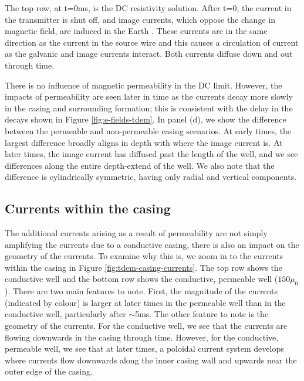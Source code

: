 The top row, at t=0ms, is the DC resistivity solution. After t=0, the current in the transmitter is shut off, and image currents, which oppose the change in magnetic field, are induced in the Earth \citep{nabighian_quasi-static_1979}. These currents are in the same direction as the current in the source wire and this causes a circulation of current as the galvanic and image currents interact. Both currents diffuse down and out through time.




There is no influence of magnetic permeability in the DC limit. However, the impacts of permeability are seen later in time as the currents decay more slowly in the casing and surrounding formation; this is consistent with the delay in the decays shown in Figure \ref{fig:e-fields-tdem}. In panel (d), we show the difference between the permeable and non-permeable casing scenarios. At early times, the largest difference broadly aligns in depth with where the image current is. At later times, the image current has diffused past the length of the well, and we see differences along the entire depth-extend of the well. We also note that the difference is cylindrically symmetric, having only radial and vertical components.


\subsection{Currents within the casing}
The additional currents arising as a result of permeability are not simply amplifying the currents due to a conductive casing, there is also an impact on the geometry of the currents. To examine why this is, we zoom in to the currents within the casing in Figure \ref{fig:tdem-casing-currents}. The top row shows the conductive well and the bottom row shows the conductive, permeable well ($150\mu_0$). There are two main features to note. First, the magnitude of the currents (indicated by colour) is larger at later times in the permeable well than in the conductive well, particularly after $\sim$5ms. The other feature to note is the geometry of the currents. For the conductive well, we see that the currents are flowing downwards in the casing through time. However, for the conductive, permeable well, we see that at later times, a poloidal current system develops where currents flow downwards along the inner casing wall and upwards near the outer edge of the casing.



